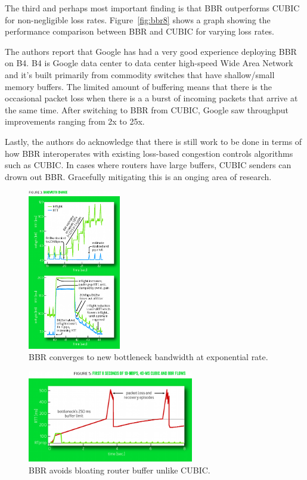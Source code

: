 The third and perhaps most important finding is that BBR outperforms CUBIC for non-negligible loss rates.
Figure~\ref{fig:bbr8} shows a graph showing the performance comparison between BBR and CUBIC
for varying loss rates.

The authors report that Google has had a very good experience deploying BBR on B4. B4 is Google  data center to
data center high-speed Wide Area Network and it's built primarily from commodity switches that have shallow/small
memory buffers. The limited amount of buffering means that there is the occasional packet loss when there is a
a burst of incoming packets that arrive at the same time. After switching to BBR from CUBIC, Google saw throughput
improvements ranging from 2x to 25x.

Lastly, the authors do acknowledge that there is still work to be done in terms of how BBR interoperates
with existing loss-based congestion controls algorithms such as CUBIC. In cases where routers have large buffers,
CUBIC senders can drown out BBR. Gracefully mitigating this is an onging area of research.



\begin{figure}[h]
  \centering
  \includegraphics[height=7cm]{./img/bbr_fig3.png}
  \caption{BBR converges to new bottleneck bandwidth at exponential rate.}
  \label{fig:bbr3}
\end{figure}


\begin{figure}[h]
  \centering
  \includegraphics[height=4cm]{./img/bbr_fig5.png}
  \caption{BBR avoids bloating router buffer unlike CUBIC.}
  \label{fig:bbr5}
\end{figure}



